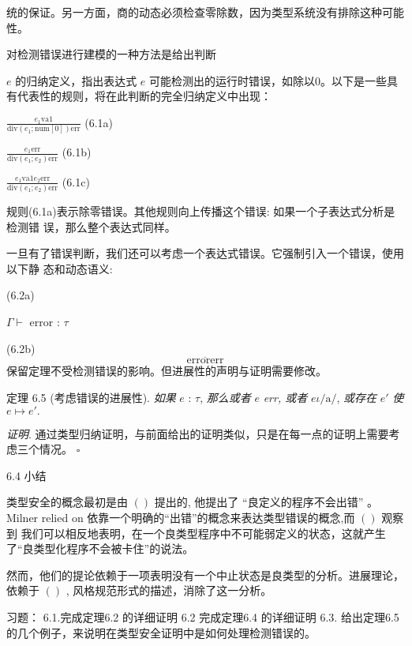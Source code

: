 统的保证。另一方面，商的动态必须检查零除数，因为类型系统没有排除这种可能性。

对检测错误进行建模的一种方法是给出判断

$e$ 的归纳定义，指出表达式 $e$ 可能检测出的运行时错误，如除以0。以下是一些具有代表性的规则，将在此判断的完全归纳定义中出现：
\begin{center}
$\displaystyle \frac{e_{1}\mathrm{v}\mathrm{a}1}{\mathrm{d}\mathrm{i}\mathrm{v}(e_{1};\mathrm{n}\mathrm{u}\mathrm{m}[0])\mathrm{e}\mathrm{r}\mathrm{r}}$   (6.1a)

$\displaystyle \frac{e_{1}\mathrm{e}\mathrm{r}\mathrm{r}}{\mathrm{d}\mathrm{i}\mathrm{v}(e_{1};e_{2})\mathrm{e}\mathrm{r}\mathrm{r}}$   (6.1b)

$\displaystyle \frac{e_{1}\mathrm{v}\mathrm{a}1e_{2}\mathrm{e}\mathrm{r}\mathrm{r}}{\mathrm{d}\mathrm{i}\mathrm{v}(e_{1};e_{2})\mathrm{e}\mathrm{r}\mathrm{r}}$   (6.1c)
\end{center}
规则(6.1a)表示除零错误。其他规则向上传播这个错误:  如果一个子表达式分析是检测错
误，那么整个表达式同样。

一旦有了错误判断，我们还可以考虑一个表达式错误。它强制引入一个错误，使用以下静
态和动态语义: 

(6.2a)

$\Gamma\vdash$ error : $\tau$

(6.2b)
$$
\overline{\mathrm{e}\mathrm{r}\mathrm{r}\mathrm{o}\mathrm{r}\mathrm{e}\mathrm{r}\mathrm{r}}
$$
保留定理不受检测错误的影响。但进展性的声明与证明需要修改。



定理 6.5 (考虑错误的进展性). {\it 如果} $e$ : $\tau$, {\it 那么或者} $e$ {\it err, 或者} $e \iota/\mathrm{a}/$, {\it 或存在} $e'$ {\it 使}$e\mapsto e'.$

{\it 证明}. 通过类型归纳证明，与前面给出的证明类似，只是在每一点的证明上需要考虑三个情况。 $\square $

6.4 小结

类型安全的概念最初是由 $()$ 提出的, 他提出了 ``良定义的程序不会出错'' 。Milner relied on 依靠一个明确的“出错”的概念来表达类型错误的概念,而 $()$ 观察到
我们可以相反地表明，在一个良类型程序中不可能弱定义的状态，这就产生了“良类型化程序不会被卡住”的说法。

然而，他们的提论依赖于一项表明没有一个中止状态是良类型的分析。进展理论，依赖于 $()$ , 风格规范形式的描述，消除了这一分析。

习题： 
6.1.完成定理6.2 的详细证明 
6.2 完成定理6.4 的详细证明 
6.3.  给出定理6.5 的几个例子，来说明在类型安全证明中是如何处理检测错误的。


